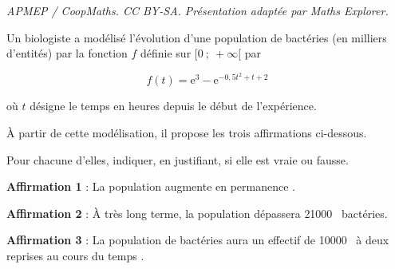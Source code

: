 \documentclass[10pt]{article}
\providecommand{\np}[2][]{{#2~#1}}
\begin{document}
\noindent\textit{APMEP / CoopMaths. CC BY-SA. Présentation adaptée par Maths Explorer.}\par\medskip
\medskip

Un biologiste a modélisé l'évolution d'une population de bactéries (en milliers d'entités) par la fonction $f$ définie sur $[0~;~+\infty[$ par

\[f(t) = \text{e}^3 - \text{e}^{-0,5t^2 + t + 2}\]

où $t$ désigne le temps en heures depuis le début de l'expérience.

\medskip

À partir de cette modélisation, il propose les trois affirmations ci-dessous.

Pour chacune d'elles, indiquer, en justifiant, si elle est vraie ou fausse.

\begin{list}{\textbullet}{}
\item\textbf{Affirmation 1} : \og La population augmente en permanence \fg.

\item\textbf{Affirmation 2} : \og  À très long terme, la population dépassera \np{21000} bactéries\fg.

\item\textbf{Affirmation 3} : \og La population de bactéries aura un effectif de \np{10000} à deux reprises au cours du temps \fg.
\end{list}
\end{document}
